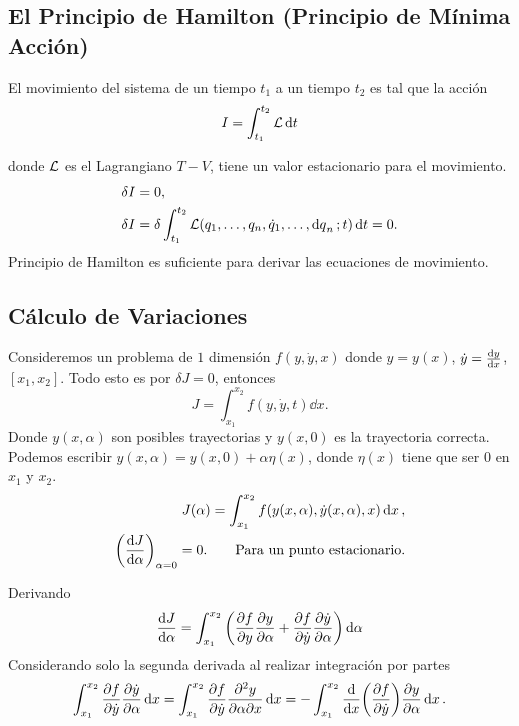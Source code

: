 \subsection{El Principio de Hamilton (Principio de Mínima Acción)}
El movimiento del sistema de un tiempo $t_1$ a un tiempo $t_2$ es tal que la acción
	\begin{equation}
		I = \int _{t_1} ^{t_2} \mathcal{L} \dd{t}
	\end{equation}

donde $\mathcal{L}$ es el Lagrangiano $T - V$, tiene un valor estacionario para el movimiento.
\begin{align*}
	\delta I &= 0, \\
	\delta I &= \delta \int _{t_1} ^{t_2} \mathcal{L} (q_1 ,\ldots ,q_n ,\dot{q}_1 ,\ldots ,\dd{q}_n ;t) \dd{t} = 0.
\end{align*}
Principio de Hamilton es suficiente para derivar las ecuaciones de movimiento.

\subsection{Cálculo de Variaciones}
Consideremos un problema de $1$ dimensión $f(y,\dot{y} ,x)$ donde $y = y(x)$, $\dot{y} = \dv{y}{x}$, $[x_1 ,x_2]$. Todo esto es por $\delta J = 0$, entonces
	\begin{equation}
		J = \int _{x_1} ^{x_2} f(y,\dot{y},t) \dd{x}.
	\end{equation}
Donde $y(x,\alpha)$ son posibles trayectorias y $y(x,0)$ es la trayectoria correcta. Podemos escribir $y(x,\alpha) = y(x,0) + \alpha \eta (x)$, donde $\eta (x)$ tiene que ser $0$ en $x_1$ y $x_2$. 
\begin{align*}
	J(\alpha) = \int _{x_1} ^{x_2} f\qty(y(x,\alpha), \dot{y} (x,\alpha), x) \dd{x}, \\
	\qty(\dv{J}{\alpha}) _{\alpha = 0} = 0. \qquad \text{Para un punto estacionario.}
\end{align*}

Derivando
\begin{equation}
	\dv{J}{\alpha} = \int _{x_1} ^{x_2} \qty(\pdv{f}{y} \pdv{y}{\alpha} + \pdv{f}{\dot{y}} \pdv{\dot{y}}{\alpha}) \dd{\alpha}
\end{equation}
Considerando solo la segunda derivada al realizar integración por partes
\begin{equation}
	\int _{x_1} ^{x_2} \pdv{f}{\dot{y}} \pdv{\dot{y}}{\alpha} \dd{x} = \int _{x_1} ^{x_2} \pdv{f}{\dot{y}} \pdv[2]{y}{\alpha}{x} \dd{x} = - \int _{x_1} ^{x_2} \dv{x} \qty(\pdv{f}{\dot{y}}) \pdv{y}{\alpha} \dd{x}.
\end{equation}

